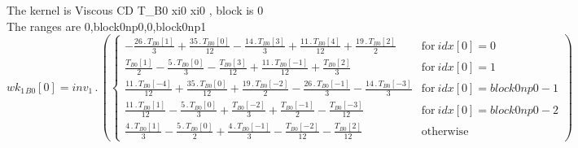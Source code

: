 \documentclass{article}
\begin{document}
\noindent The kernel is Viscous CD T_B0 xi0 xi0 , block is 0\\\noindent The ranges are 0,block0np0,0,block0np1\\\begin{dmath}{wk_{1}{_{B0}}}[{0}] = inv_1 \,.\, \left(\begin{cases} - \frac{26 \,.\, {T{_{B0}}}[{1}]}{3} + \frac{35 \,.\, {T{_{B0}}}[{0}]}{12} - \frac{14 \,.\, {T{_{B0}}}[{3}]}{3} + \frac{11 \,.\, {T{_{B0}}}[{4}]}{12} + \frac{19 \,.\, 
{T{_{B0}}}[{2}]}{2} & \text{for}\: {idx}[{0}] = 0 \\\frac{{T{_{B0}}}[{1}]}{2} - \frac{5 \,.\, {T{_{B0}}}[{0}]}{3} - \frac{{T{_{B0}}}[{3}]}{12} + \frac{11 \,.\, {T{_{B0}}}[{-1}]}{12} + \frac{{T{_{B0}}}[{2}]}{3} & \text{for}\: {idx}[{0}] = 1 \\\frac{11 
\,.\, {T{_{B0}}}[{-4}]}{12} + \frac{35 \,.\, {T{_{B0}}}[{0}]}{12} + \frac{19 \,.\, {T{_{B0}}}[{-2}]}{2} - \frac{26 \,.\, {T{_{B0}}}[{-1}]}{3} - \frac{14 \,.\, {T{_{B0}}}[{-3}]}{3} & \text{for}\: {idx}[{0}] = block0np0 - 1 \\\frac{11 \,.\, 
{T{_{B0}}}[{1}]}{12} - \frac{5 \,.\, {T{_{B0}}}[{0}]}{3} + \frac{{T{_{B0}}}[{-2}]}{3} + \frac{{T{_{B0}}}[{-1}]}{2} - \frac{{T{_{B0}}}[{-3}]}{12} & \text{for}\: {idx}[{0}] = block0np0 - 2 \\\frac{4 \,.\, {T{_{B0}}}[{1}]}{3} - \frac{5 \,.\, 
{T{_{B0}}}[{0}]}{2} + \frac{4 \,.\, {T{_{B0}}}[{-1}]}{3} - \frac{{T{_{B0}}}[{-2}]}{12} - \frac{{T{_{B0}}}[{2}]}{12} & \text{otherwise} \end{cases}\right)\end{dmath}
\end{document}

